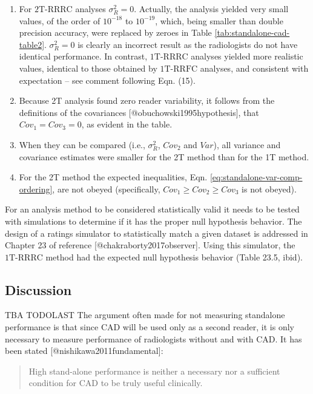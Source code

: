 \documentclass[
]{article}
\providecommand{\tightlist}{%
  \setlength{\itemsep}{0pt}\setlength{\parskip}{0pt}}
\begin{document}
\begin{enumerate}
\def\labelenumi{\arabic{enumi}.}
\tightlist
\item
  For \(\text{2T-RRRC}\) analyses \(\sigma_R^2 = 0\). Actually, the analysis yielded very small values, of the order of \(10^{-18}\) to \(10^{-19}\), which, being smaller than double precision accuracy, were replaced by zeroes in Table \ref{tab:standalone-cad-table2}. \(\sigma_R^2 = 0\) is clearly an incorrect result as the radiologists do not have identical performance. In contrast, \(\text{1T-RRRC}\) analyses yielded more realistic values, identical to those obtained by \(\text{1T-RRFC}\) analyses, and consistent with expectation -- see comment following Eqn. (15).
\item
  Because 2T analysis found zero reader variability, it follows from the definitions of the covariances {[}@obuchowski1995hypothesis{]}, that \(Cov_1 = Cov_3 = 0\), as evident in the table.
\item
  When they can be compared (i.e., \(\sigma_R^2\), \(Cov_2\) and \(Var\)), all variance and covariance estimates were smaller for the 2T method than for the 1T method.
\item
  For the 2T method the expected inequalities, Eqn. \eqref{eq:standalone-var-comp-ordering}, are not obeyed (specifically, \(Cov_1 \geq Cov_2 \geq Cov_3\) is not obeyed).
\end{enumerate}

For an analysis method to be considered statistically valid it needs to be tested with simulations to determine if it has the proper null hypothesis behavior. The design of a ratings simulator to statistically match a given dataset is addressed in Chapter 23 of reference {[}@chakraborty2017observer{]}. Using this simulator, the \(\text{1T-RRRC}\) method had the expected null hypothesis behavior (Table 23.5, ibid).

\hypertarget{standalone-cad-radiologists-discussion}{%
\subsection{Discussion}\label{standalone-cad-radiologists-discussion}}

TBA TODOLAST The argument often made for not measuring standalone performance is that since CAD will be used only as a second reader, it is only necessary to measure performance of radiologists without and with CAD. It has been stated {[}@nishikawa2011fundamental{]}:

\begin{quote}
High stand-alone performance is neither a necessary nor a sufficient condition for CAD to be truly useful clinically.
\end{quote}
\end{document}
